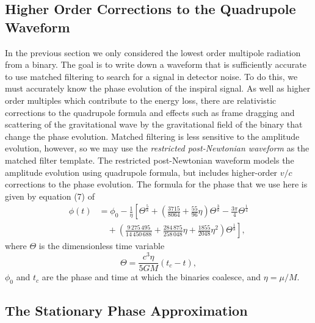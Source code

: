 \subsection{Higher Order Corrections to the Quadrupole Waveform}

In the previous section we only considered the lowest order multipole
radiation from a binary. The goal is to write down a waveform that is
sufficiently accurate to use matched filtering to search for a signal in
detector noise. To do this, we must accurately know the phase evolution of the
inspiral signal. As well as higher order multiples which contribute to the
energy loss, there are relativistic corrections to the quadrupole formula and
effects such as frame dragging and scattering of the gravitational wave by the
gravitational field of the binary that change the phase evolution. Matched
filtering is less sensitive to the amplitude evolution, however, so we may use
the \emph{restricted post-Newtonian waveform} as the matched filter template.
The restricted post-Newtonian waveform models the amplitude evolution using
quadrupole formula, but includes higher-order $v/c$ corrections to the phase
evolution. The formula for the phase that we use here is given by equation (7)
of \cite{Blanchet:1996pi}
\begin{equation}
\begin{split}
\phi(t) &= \phi_0 - \frac{1}{\eta} \left[ 
\Theta^\frac{5}{8} + \left(\frac{3715}{8064} + \frac{55}{96}\eta\right)
\Theta^\frac{3}{8} - \frac{3\pi}{4} \Theta^\frac{1}{4} \right. \\
&\quad 
+\left. \left(\frac{9\,275\,495}{14\,450\,688} + \frac{284\,875}{258\,048}\eta +
\frac{1855}{2048} \eta^2\right) \Theta^\frac{1}{8} \right],
\label{eq:biwwphase}
\end{split}
\end{equation}
where $\Theta$ is the dimensionless time variable
\begin{equation}
\Theta = \frac{c^3\eta}{5GM}(t_c - t),
\end{equation}
$\phi_0$ and $t_c$ are the phase and time at which the binaries coalesce, and
$\eta = \mu / M$.

\subsection{The Stationary Phase Approximation}
\label{ss:stationaryphase}

